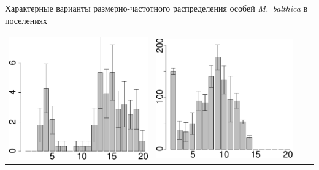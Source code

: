 \documentclass{beamer}
\begin{document}
\begin{frame}{Характерные варианты размерно-частотного распределения особей {\it M.~balthica} в поселениях}
\begin{tabularx}{\linewidth}{XX|XX}
			\includegraphics[width=\linewidth]{DZ_2006_.pdf} & 
			\includegraphics[width=\linewidth]{sizestr2_2012_.pdf} & 

\end{tabularx}
\end{frame}
\end{document}
